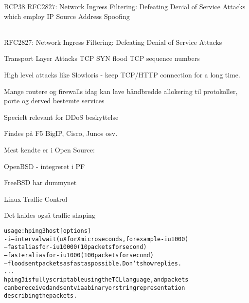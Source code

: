 \documentclass[Screen16to9,17pt]{foils}
\begin{document}

BCP38 RFC2827: Network Ingress Filtering: Defeating Denial of Service Attacks which employ IP Source Address Spoofing

{\small{}}\\
RFC2827: Network Ingress Filtering: Defeating Denial of Service Attacks








\begin{list2}
\item Transport Layer Attacks TCP SYN flood TCP sequence numbers
\item High level attacks like Slowloris - keep TCP/HTTP connection for a long time.
\end{list2}


\begin{list1}
\item Mange routere og firewalls idag kan lave båndbredde allokering til
  protokoller, porte og derved bestemte services
  \item Specielt relevant for DDoS beskyttelse
  \item Findes på F5 BigIP, Cisco, Junos osv.
\item Mest kendte er i Open Source:
\begin{list2}
\item OpenBSD - integreret i PF
\item FreeBSD har dummynet
\item Linux Traffic Control
\end{list2}
\item Det kaldes også traffic shaping
\end{list1}


\begin{alltt}\footnotesize
usage: hping3 host [options]
  -i  --interval  wait (uX for X microseconds, for example -i u1000)
      --fast      alias for -i u10000 (10 packets for second)
      --faster    alias for -i u1000 (100 packets for second)
      --flood      sent packets as fast as possible. Don't show replies.
...
hping3 is fully scriptable using the TCL language, and packets
can be received and sent via a binary or string representation
describing the packets.
\end{alltt}
\end{document}
